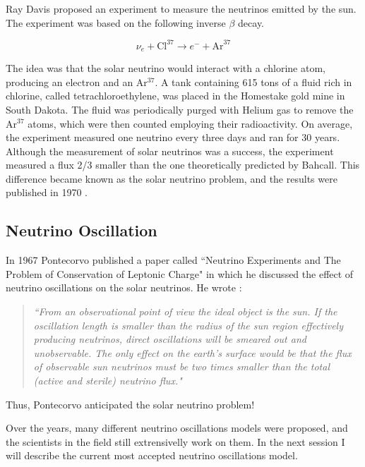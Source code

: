 Ray Davis proposed an experiment to measure the neutrinos emitted by the sun. The experiment was based on the following inverse $\beta$ decay.

\begin{equation}
		\nu_e + \textrm{Cl}^{37} \longrightarrow e^- +\textrm{Ar}^{37}
		\label{solar_reaction-2}
\end{equation}

The idea was that the solar neutrino would interact with a chlorine atom, producing an electron and an Ar$^{37}$. A tank containing 615 tons of a fluid rich in chlorine, called tetrachloroethylene, was placed in the Homestake gold mine in South Dakota. The fluid was periodically purged with Helium gas to remove the Ar$^{37}$ atoms, which were then counted employing their radioactivity. On average, the experiment measured one neutrino every three days and ran for 30 years. Although the measurement of solar neutrinos was a success, the experiment measured a flux 2/3 smaller than the one theoretically predicted by Bahcall. This difference became known as the solar neutrino problem, and the results were published in 1970 \cite{the_story_of_the_neutrino}.

\subsection{Neutrino Oscillation}

In 1967 Pontecorvo published a paper called ``Neutrino Experiments and The Problem of Conservation of Leptonic Charge" in which he discussed the effect of neutrino oscillations on the solar neutrinos. He wrote \cite{pontecorvo_1967}: 
\begin{quote}
\emph{``From an observational point of view the ideal object is the sun. If the oscillation length is smaller than the radius of the sun region effectively producing neutrinos, direct oscillations will be smeared out and unobservable. The only effect on the earth’s surface would be that the flux of observable sun neutrinos must be two times smaller than the total (active and sterile) neutrino flux."}
\end{quote}

Thus, Pontecorvo anticipated the solar neutrino problem!

Over the years, many different neutrino oscillations models were proposed, and the scientists in the field still extrensivelly work on them. In the next session I will describe the current most accepted neutrino oscillations model. 

